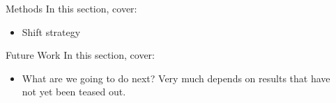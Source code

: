 \documentclass[final]{beamer}
\newlength{\onecolwid}
\newlength{\twocolwid}
\begin{document}
\begin{frame}[t]
\begin{columns}[t]
\begin{column}{\twocolwid}
\begin{columns}[t,totalwidth=\twocolwid]
\begin{column}{\onecolwid}
\end{column} %

\begin{column}{\onecolwid}\vspace{-.6in} %

\begin{block}{Methods}
In this section, cover:
\begin{itemize}
\item Shift strategy
\end{itemize}
\end{block}

\begin{block}{Future Work}
In this section, cover:
\begin{itemize}
\item What are we going to do next? Very much depends on results that have not
yet been teased out.
\end{itemize}
\end{block}


\end{column} %

\end{columns} %


%
%
%
%
%
%


\end{column}
\end{columns}
\end{frame}
\end{document}
